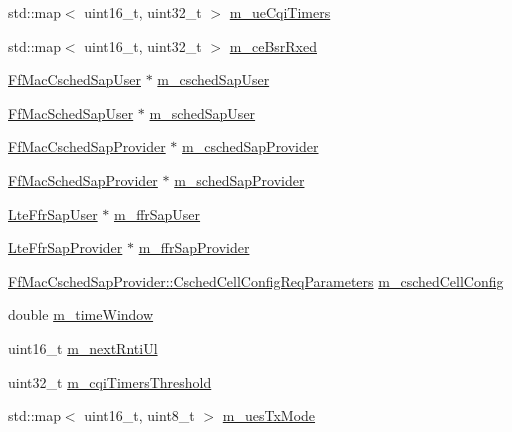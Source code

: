 \begin{DoxyCompactItemize}
std\+::map$<$ uint16\+\_\+t, uint32\+\_\+t $>$ \hyperlink{classns3_1_1PssFfMacScheduler_a1cc9115fabab47bd1c6de8fa20725782}{m\+\_\+ue\+Cqi\+Timers}
\item 
std\+::map$<$ uint16\+\_\+t, uint32\+\_\+t $>$ \hyperlink{classns3_1_1PssFfMacScheduler_a7adb86186e0190e6b0aa66a562499268}{m\+\_\+ce\+Bsr\+Rxed}
\item 
\hyperlink{classns3_1_1FfMacCschedSapUser}{Ff\+Mac\+Csched\+Sap\+User} $\ast$ \hyperlink{classns3_1_1PssFfMacScheduler_a502c23d2808cc6888f04b996ca6a2f2f}{m\+\_\+csched\+Sap\+User}
\item 
\hyperlink{classns3_1_1FfMacSchedSapUser}{Ff\+Mac\+Sched\+Sap\+User} $\ast$ \hyperlink{classns3_1_1PssFfMacScheduler_aef80e10798607daea4efdf4cf1297bd9}{m\+\_\+sched\+Sap\+User}
\item 
\hyperlink{classns3_1_1FfMacCschedSapProvider}{Ff\+Mac\+Csched\+Sap\+Provider} $\ast$ \hyperlink{classns3_1_1PssFfMacScheduler_ac11b1d69f7082523bec1759f39331619}{m\+\_\+csched\+Sap\+Provider}
\item 
\hyperlink{classns3_1_1FfMacSchedSapProvider}{Ff\+Mac\+Sched\+Sap\+Provider} $\ast$ \hyperlink{classns3_1_1PssFfMacScheduler_a9c95ea6430238a972ca249cc7c017a91}{m\+\_\+sched\+Sap\+Provider}
\item 
\hyperlink{classns3_1_1LteFfrSapUser}{Lte\+Ffr\+Sap\+User} $\ast$ \hyperlink{classns3_1_1PssFfMacScheduler_aba075c2fcb5d36a9276a0519a53ad5b2}{m\+\_\+ffr\+Sap\+User}
\item 
\hyperlink{classns3_1_1LteFfrSapProvider}{Lte\+Ffr\+Sap\+Provider} $\ast$ \hyperlink{classns3_1_1PssFfMacScheduler_a8b7889293dd002f806e2d6afd9c50aed}{m\+\_\+ffr\+Sap\+Provider}
\item 
\hyperlink{structns3_1_1FfMacCschedSapProvider_1_1CschedCellConfigReqParameters}{Ff\+Mac\+Csched\+Sap\+Provider\+::\+Csched\+Cell\+Config\+Req\+Parameters} \hyperlink{classns3_1_1PssFfMacScheduler_a6808e2b2024ed0ced82f80bfe6f0801f}{m\+\_\+csched\+Cell\+Config}
\item 
double \hyperlink{classns3_1_1PssFfMacScheduler_aecdbf7e675d36f9ed48a35d8135fb08e}{m\+\_\+time\+Window}
\item 
uint16\+\_\+t \hyperlink{classns3_1_1PssFfMacScheduler_a9bbe57fde0c3046e43a686473b5e33ff}{m\+\_\+next\+Rnti\+Ul}
\item 
uint32\+\_\+t \hyperlink{classns3_1_1PssFfMacScheduler_a56d836fa470b6d79eca2b03258325373}{m\+\_\+cqi\+Timers\+Threshold}
\item 
std\+::map$<$ uint16\+\_\+t, uint8\+\_\+t $>$ \hyperlink{classns3_1_1PssFfMacScheduler_a48aa1d9dc22e9c73e3c2206be76bb6cd}{m\+\_\+ues\+Tx\+Mode}

\end{DoxyCompactItemize}
